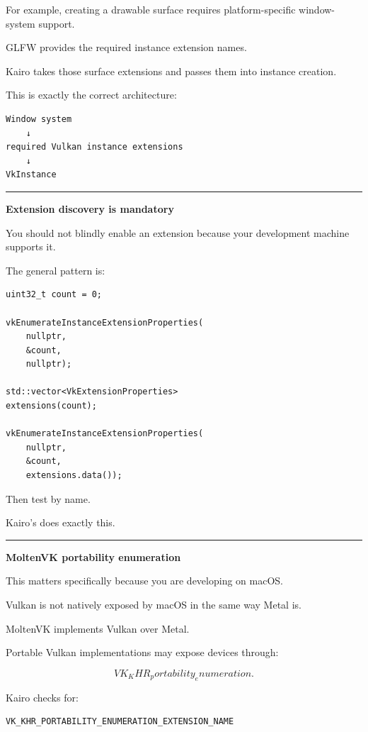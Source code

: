 For example, creating a drawable surface requires platform-specific window-system support.

GLFW provides the required instance extension names.

Kairo takes those surface extensions and passes them into instance creation.

This is exactly the correct architecture:

\begin{verbatim}
Window system
    ↓
required Vulkan instance extensions
    ↓
VkInstance
\end{verbatim}

\begin{center}\rule{0.5\linewidth}{0.5pt}\end{center}

\textbf{Extension discovery is mandatory}

You should not blindly enable an extension because your development machine supports it.

The general pattern is:

\begin{verbatim}
uint32_t count = 0;

vkEnumerateInstanceExtensionProperties(
    nullptr,
    &count,
    nullptr);

std::vector<VkExtensionProperties>
extensions(count);

vkEnumerateInstanceExtensionProperties(
    nullptr,
    &count,
    extensions.data());
\end{verbatim}

Then test by name.

Kairo's  does exactly this.

\begin{center}\rule{0.5\linewidth}{0.5pt}\end{center}

\textbf{MoltenVK portability enumeration}

This matters specifically because you are developing on macOS.

Vulkan is not natively exposed by macOS in the same way Metal is.

MoltenVK implements Vulkan over Metal.

Portable Vulkan implementations may expose devices through:

\[
VK_KHR_portability_enumeration.
\]

Kairo checks for:

\begin{verbatim}
VK_KHR_PORTABILITY_ENUMERATION_EXTENSION_NAME
\end{verbatim}

